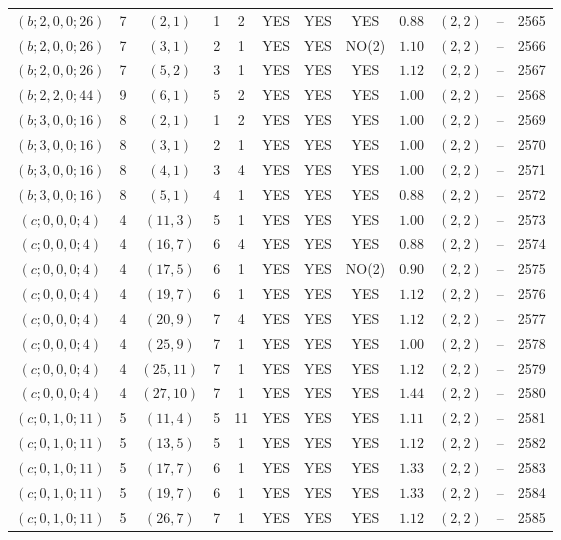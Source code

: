 \begin{longtable}{|c|c|c|c|c|c|c|c|c|c|c|c|}
$(b;2,0,0;26)$ & 7 & $(2,1)$ & 1 & 2 & YES & YES & YES & $0.88$ & $(2,2)$ & -- & 2565\\
$(b;2,0,0;26)$ & 7 & $(3,1)$ & 2 & 1 & YES & YES & NO(2) & $1.10$ & $(2,2)$ & -- & 2566\\
$(b;2,0,0;26)$ & 7 & $(5,2)$ & 3 & 1 & YES & YES & YES & $1.12$ & $(2,2)$ & -- & 2567\\
$(b;2,2,0;44)$ & 9 & $(6,1)$ & 5 & 2 & YES & YES & YES & $1.00$ & $(2,2)$ & -- & 2568\\
$(b;3,0,0;16)$ & 8 & $(2,1)$ & 1 & 2 & YES & YES & YES & $1.00$ & $(2,2)$ & -- & 2569\\
$(b;3,0,0;16)$ & 8 & $(3,1)$ & 2 & 1 & YES & YES & YES & $1.00$ & $(2,2)$ & -- & 2570\\
$(b;3,0,0;16)$ & 8 & $(4,1)$ & 3 & 4 & YES & YES & YES & $1.00$ & $(2,2)$ & -- & 2571\\
$(b;3,0,0;16)$ & 8 & $(5,1)$ & 4 & 1 & YES & YES & YES & $0.88$ & $(2,2)$ & -- & 2572\\
$(c;0,0,0;4)$ & 4 & $(11,3)$ & 5 & 1 & YES & YES & YES & $1.00$ & $(2,2)$ & -- & 2573\\
$(c;0,0,0;4)$ & 4 & $(16,7)$ & 6 & 4 & YES & YES & YES & $0.88$ & $(2,2)$ & -- & 2574\\
$(c;0,0,0;4)$ & 4 & $(17,5)$ & 6 & 1 & YES & YES & NO(2) & $0.90$ & $(2,2)$ & -- & 2575\\
$(c;0,0,0;4)$ & 4 & $(19,7)$ & 6 & 1 & YES & YES & YES & $1.12$ & $(2,2)$ & -- & 2576\\
$(c;0,0,0;4)$ & 4 & $(20,9)$ & 7 & 4 & YES & YES & YES & $1.12$ & $(2,2)$ & -- & 2577\\
$(c;0,0,0;4)$ & 4 & $(25,9)$ & 7 & 1 & YES & YES & YES & $1.00$ & $(2,2)$ & -- & 2578\\
$(c;0,0,0;4)$ & 4 & $(25,11)$ & 7 & 1 & YES & YES & YES & $1.12$ & $(2,2)$ & -- & 2579\\
$(c;0,0,0;4)$ & 4 & $(27,10)$ & 7 & 1 & YES & YES & YES & $1.44$ & $(2,2)$ & -- & 2580\\
$(c;0,1,0;11)$ & 5 & $(11,4)$ & 5 & 11 & YES & YES & YES & $1.11$ & $(2,2)$ & -- & 2581\\
$(c;0,1,0;11)$ & 5 & $(13,5)$ & 5 & 1 & YES & YES & YES & $1.12$ & $(2,2)$ & -- & 2582\\
$(c;0,1,0;11)$ & 5 & $(17,7)$ & 6 & 1 & YES & YES & YES & $1.33$ & $(2,2)$ & -- & 2583\\
$(c;0,1,0;11)$ & 5 & $(19,7)$ & 6 & 1 & YES & YES & YES & $1.33$ & $(2,2)$ & -- & 2584\\
$(c;0,1,0;11)$ & 5 & $(26,7)$ & 7 & 1 & YES & YES & YES & $1.12$ & $(2,2)$ & -- & 2585\\

\end{longtable}
